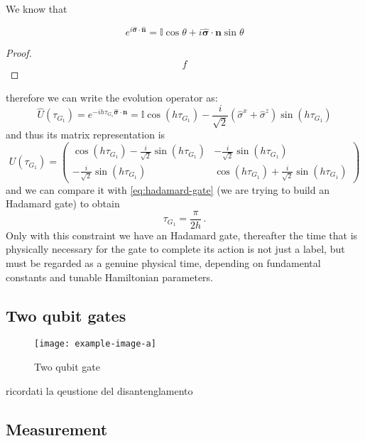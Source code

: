 We know that
\begin{theorem}
\begin{equation*}
e^{i\hat{\boldsymbol{\sigma}} \cdot \hat{\boldsymbol{n}}} = \mathbb{I}\cos{\theta} + i\hat{\boldsymbol{\sigma}} \cdot \boldsymbol{n} \sin{\theta}
\end{equation*}
\end{theorem}
\begin{proof}
\begin{equation*}
    f
\end{equation*}
\end{proof}
therefore we can write the evolution operator as:
\begin{equation*}
    \hat{U}(\tau_{G_1}) = e^{-ih\tau_{G_1} \hat{\boldsymbol{\sigma}} \cdot \boldsymbol{n}} = \mathbb{I}\cos(h\tau_{G_1}) - \frac{i}{\sqrt{2}} (\hat{\sigma}^x + \hat{\sigma}^z) \sin(h\tau_{G_1})
\end{equation*}
and thus its matrix representation is
\begin{equation*}
    U(\tau_{G_1}) = 
    \begin{pmatrix}
    \cos(h\tau_{G_1}) - \frac{i}{\sqrt{2}} \sin(h\tau_{G_1})  & - \frac{i}{\sqrt{2}} \sin(h\tau_{G_1}) \\
    - \frac{i}{\sqrt{2}} \sin(h\tau_{G_1}) & \cos(h\tau_{G_1}) + \frac{i}{\sqrt{2}} \sin(h\tau_{G_1})
    \end{pmatrix}
\end{equation*}
and we can compare it with \ref{eq:hadamard-gate} (we are trying to build an Hadamard gate) to obtain
\begin{equation*}
    \tau_{G_1} = \frac{\pi}{2h}\,.
\end{equation*}
Only with this constraint we have an Hadamard gate, thereafter the time that is physically necessary for the gate to complete its action is not just a
label, but must be regarded as a genuine physical time, depending on fundamental constants and tunable Hamiltonian parameters.
\subsection{Two qubit gates}
\begin{figure}
\centering
\texttt{[image: example-image-a]}
\caption{Two qubit gate}
\label{fig:two-qubit-gate}
\end{figure}
ricordati la qeustione del disantenglamento

\subsection{Measurement}\label{sec:measurement}
